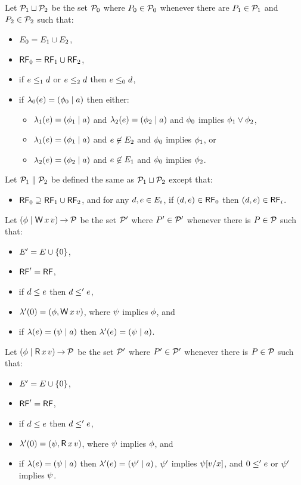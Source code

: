 Let $\mathcal{P}_1 \sqcup \mathcal{P}_2$ be the set $\mathcal{P}_0$ where $P_0 \in \mathcal{P}_0$
whenever there are $P_1 \in \mathcal{P}_1$ and  $P_2 \in \mathcal{P}_2$ such that:
\begin{itemize}
\item $E_0 = E_1 \cup E_2$,
\item $\mathsf{RF}_0 = \mathsf{RF}_1 \cup \mathsf{RF}_2$,
\item if $e \le_1 d$ or $e \le_2 d$ then $e \le_0 d$,
\item if $\lambda_0(e) = (\phi_0 \mid a)$ then either:
  \begin{itemize}
  \item $\lambda_1(e) = (\phi_1 \mid a)$ and $\lambda_2(e) = (\phi_2 \mid a)$
    and $\phi_0$ implies $\phi_1 \lor \phi_2$,
  \item $\lambda_1(e) = (\phi_1 \mid a)$ and $e \not\in E_2$
    and $\phi_0$ implies $\phi_1$, or
  \item $\lambda_2(e) = (\phi_2 \mid a)$ and $e \not\in E_1$
    and $\phi_0$ implies $\phi_2$.
  \end{itemize}
\end{itemize}
Let $\mathcal{P}_1 \parallel \mathcal{P}_2$ be defined the same as $\mathcal{P}_1 \sqcup \mathcal{P}_2$ except that:
\begin{itemize}
\item $\mathsf{RF}_0 \supseteq \mathsf{RF}_1 \cup \mathsf{RF}_2$, and
 for any $d, e \in E_i$, if $(d,e)\in\mathsf{RF}_0$ then $(d,e)\in\mathsf{RF}_i$.
\end{itemize}
Let $(\phi \mid \mathsf{W}\,x\,v) \mathbin\rightarrow \mathcal{P}$ be the set $\mathcal{P}'$ where $P'\in\mathcal{P}'$ whenever
there is $P\in\mathcal{P}$ such that:
\begin{itemize}
\item $E' = E \cup \{0\}$,
\item $\mathsf{RF}' = \mathsf{RF}$,
\item if $d \le e$ then $d \le' e$,
\item $\lambda'(0) = (\phi, \mathsf{W}\,x\,v)$, where $\psi$ implies $\phi$, and
\item if $\lambda(e) = (\psi \mid a)$ then $\lambda'(e) = (\psi \mid a)$.
\end{itemize}
Let $(\phi \mid \mathsf{R}\,x\,v) \mathbin\rightarrow \mathcal{P}$ be the set $\mathcal{P}'$ where $P'\in\mathcal{P}'$ whenever
there is $P\in\mathcal{P}$ such that:
\begin{itemize}
\item $E' = E \cup \{0\}$,
\item $\mathsf{RF}' = \mathsf{RF}$,
\item if $d \le e$ then $d \le' e$,
\item $\lambda'(0) = (\psi, \mathsf{R}\,x\,v)$, where $\psi$ implies $\phi$, and
\item if $\lambda(e) = (\psi \mid a)$ then
  $\lambda'(e) = (\psi' \mid a)$,
  $\psi'$ implies $\psi[v/x]$, and
  $0 \le' e$ or $\psi'$ implies $\psi$.
\end{itemize}
